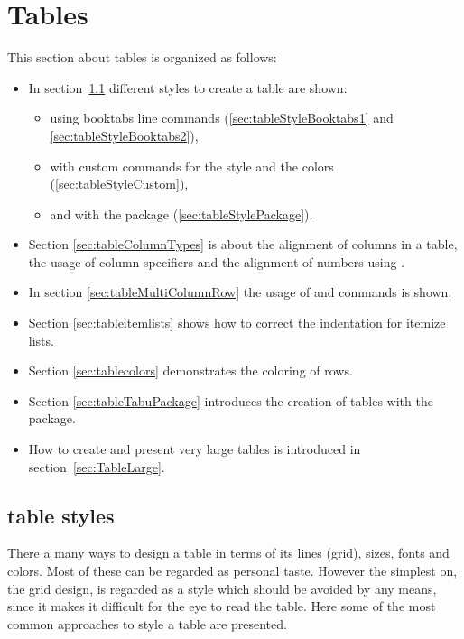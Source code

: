 \section{Tables}
%
This section about tables is organized as follows:
\begin{itemize}
\item In section~\ref{sec:tableStylesIntro} different styles to create a table are shown: 
  \begin{itemize}
  \item using booktabs line commands (\ref{sec:tableStyleBooktabs1} and
        \ref{sec:tableStyleBooktabs2}),
  \item with custom commands for the style and the colors
        (\ref{sec:tableStyleCustom}), 
  \item and with the package 
        (\ref{sec:tableStylePackage}).
  \end{itemize}
%
\item Section \ref{sec:tableColumnTypes} is about
      the alignment of columns in a table, the usage of column specifiers and the alignment of numbers using .
%
\item In section \ref{sec:tableMultiColumnRow} the usage of 
       and  commands is shown.
%
\item Section \ref{sec:tableitemlists} shows how to correct the indentation
      for itemize lists.
%
\item Section \ref{sec:tablecolors} demonstrates the coloring of rows.
%
\item Section \ref{sec:tableTabuPackage} 
      introduces the creation of tables with the  package.
%
\item How to create and present very large tables is introduced in section~\ref{sec:TableLarge}.
\end{itemize}

\subsection{table styles}
\label{sec:tableStylesIntro}

There a many ways to design a table in terms of its lines (grid), sizes, fonts and colors. Most of these can be regarded as personal taste. However the simplest on, the grid design, is regarded as a style which should be avoided by any means, since it makes it difficult for the eye to read the table.
Here some of the most common approaches to style a table are presented.

